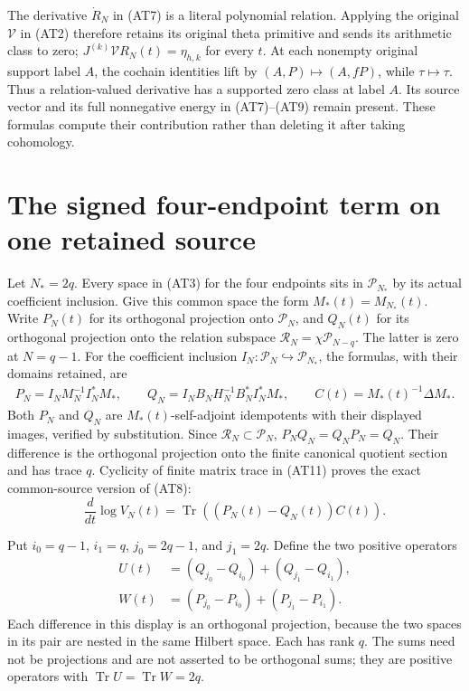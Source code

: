 \documentclass{article}
\newcommand{\Tr}{\operatorname{Tr}}
\newcommand{\cP}{\mathcal P}
\newcommand{\cR}{\mathcal R}
\begin{document}
The derivative $\dot R_N$ in (AT7) is a literal polynomial relation.
Applying the original $\mathcal V$ in (AT2) therefore retains its
original theta primitive and sends its arithmetic class to zero;
$J^{(k)}\mathcal V R_N(t)=\eta_{h,k}$ for every $t$.
At each nonempty original support label $A$, the cochain identities
lift by $(A,P)\mapsto(A,fP)$, while $\tau\mapsto\tau$.
Thus a relation-valued derivative has a supported zero class at
label $A$. Its source vector and its full nonnegative energy in
(AT7)--(AT9) remain present. These formulas compute their
contribution rather than deleting it after taking cohomology.

\section{The signed four-endpoint term on one retained source}

Let $N_*=2q$. Every space in (AT3) for the four endpoints sits in
$\cP_{N_*}$ by its actual coefficient inclusion. Give this common
space the form $M_*(t)=M_{N_*}(t)$. Write $P_N(t)$ for its
orthogonal projection onto $\cP_N$, and $Q_N(t)$ for its
orthogonal projection onto the relation subspace
$\cR_N=\chi\cP_{N-q}$. The latter is zero at $N=q-1$.
For the coefficient inclusion $I_N:\cP_N\hookrightarrow\cP_{N_*}$,
the formulas, with their domains retained, are
\[
 \begin{gathered}
 P_N=I_NM_N^{-1}I_N^*M_*,\qquad
 Q_N=I_NB_NH_N^{-1}B_N^*I_N^*M_*,\qquad
 C(t)=M_*(t)^{-1}\Delta M_*.                   \end{gathered}
 \tag{AT11}
\]
Both $P_N$ and $Q_N$ are $M_*(t)$-self-adjoint idempotents with
their displayed images, verified by substitution. Since
$\cR_N\subset\cP_N$, $P_NQ_N=Q_NP_N=Q_N$. Their difference is
the orthogonal projection onto the finite canonical quotient
section and has trace $q$. Cyclicity of finite matrix trace in
(AT11) proves the exact common-source version of (AT8):
\[
 \frac{d}{dt}\log V_N(t)=\Tr((P_N(t)-Q_N(t))C(t)).
                                                        \tag{AT12}
\]

Put $i_0=q-1$, $i_1=q$, $j_0=2q-1$, and $j_1=2q$.
Define the two positive operators
\[
 \begin{split}
 U(t)&=(Q_{j_0}-Q_{i_0})+(Q_{j_1}-Q_{i_1}),\\
 W(t)&=(P_{j_0}-P_{i_0})+(P_{j_1}-P_{i_1}).    \end{split}
 \tag{AT13}
\]
Each difference in this display is an orthogonal projection,
because the two spaces in its pair are nested in the same
Hilbert space. Each has rank $q$. The sums need not be
projections and are not asserted to be orthogonal sums; they
are positive operators with $\Tr U=\Tr W=2q$.
\end{document}

